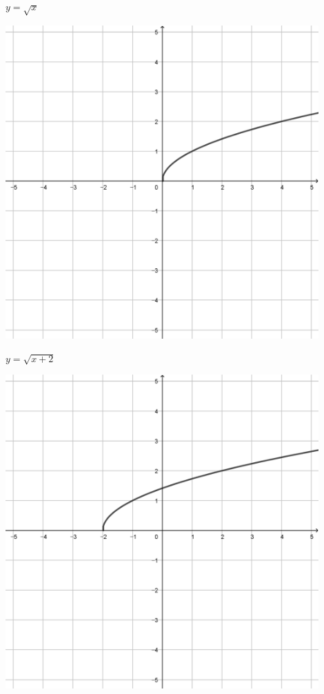 \documentclass[a4paper]{oblivoir}
\begin{document}
\clearpage
\begin{minipage}{0.45\textwidth}\centering
\(y=\sqrt x\)
\par\bigskip\includegraphics[width=0.9\textwidth]{img/5_irrational_11}
\end{minipage}
\begin{minipage}{0.45\textwidth}\centering
\(y=\sqrt{x+2}\)
\par\bigskip\includegraphics[width=0.9\textwidth]{img/5_irrational_12}
\end{minipage}\bigskip\bigskip\par
\end{document}
